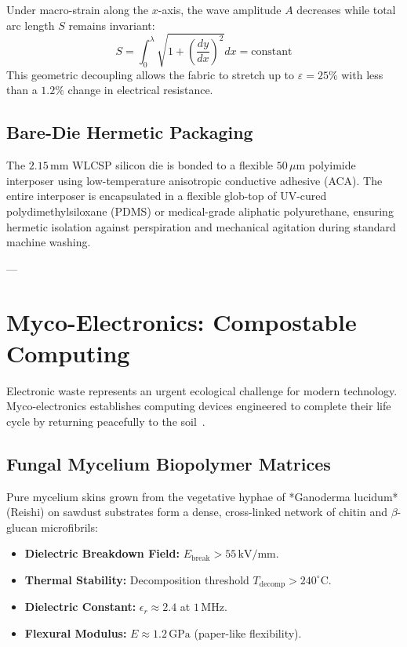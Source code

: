 \documentclass[10pt,twocolumn,letterpaper]{article}
\begin{document}
Under macro-strain along the $x$-axis, the wave amplitude $A$ decreases while total arc length $S$ remains invariant:
\begin{equation}
S = \int_{0}^{\lambda} \sqrt{1 + \left(\frac{dy}{dx}\right)^2} dx = \text{constant}
\end{equation}
This geometric decoupling allows the fabric to stretch up to $\varepsilon = 25\%$ with less than a $1.2\%$ change in electrical resistance.

\subsection{Bare-Die Hermetic Packaging}

The $2.15\,\text{mm}$ WLCSP silicon die is bonded to a flexible $50\,\mu\text{m}$ polyimide interposer using low-temperature anisotropic conductive adhesive (ACA). The entire interposer is encapsulated in a flexible glob-top of UV-cured polydimethylsiloxane (PDMS) or medical-grade aliphatic polyurethane, ensuring hermetic isolation against perspiration and mechanical agitation during standard machine washing.

---

\section{Myco-Electronics: Compostable Computing}

Electronic waste represents an urgent ecological challenge for modern technology. Myco-electronics establishes computing devices engineered to complete their life cycle by returning peacefully to the soil~\cite{danninger2022mycelium,hwang2012transient}.

\subsection{Fungal Mycelium Biopolymer Matrices}

Pure mycelium skins grown from the vegetative hyphae of *Ganoderma lucidum* (Reishi) on sawdust substrates form a dense, cross-linked network of chitin and $\beta$-glucan microfibrils:
\begin{itemize}
    \setlength{\itemsep}{1pt}
    \item \textbf{Dielectric Breakdown Field:} $E_{\text{break}} > 55\,\text{kV/mm}$.
    \item \textbf{Thermal Stability:} Decomposition threshold $T_{\text{decomp}} > 240^{\circ}\text{C}$.
    \item \textbf{Dielectric Constant:} $\epsilon_r \approx 2.4$ at $1\,\text{MHz}$.
    \item \textbf{Flexural Modulus:} $E \approx 1.2\,\text{GPa}$ (paper-like flexibility).
\end{itemize}
\end{document}
